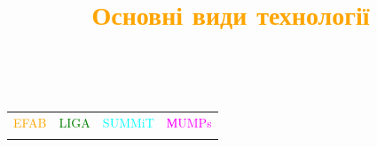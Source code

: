 \documentclass[aspectratio=169]{beamer}
\begin{document}
{
\title{\textcolor{orange}{Основні види технології}}
\begin{frame}
\\
\setlength\arrayrulewidth{2pt}
\setlength\doublerulesep{2pt}
\begin {center}
\begin{tabular}{||c||c||c||c||}
\hhline{|t:=:t:=:t:=t:=:t|}
\textcolor{orange}{EFAB} & \textcolor{green}{LIGA}& \textcolor{cyan}{SUMMiT} & \textcolor{magenta}{МUMPs}\\
\hhline{|b:=:b:=:b:=b:=:b|}
\end{tabular}
\end{center}
\end{frame}
}
\end{document}
